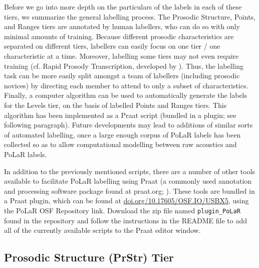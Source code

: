 \documentclass[11pt, twoside]{memoir}
\begin{document}
Before we go into more depth on the particulars of the labels in each of these tiers, we summarize the general labelling process. The Prosodic Structure, Points, and Ranges tiers are annotated by human labellers, who can do so with only minimal amounts of training. Because different prosodic characteristics are separated on different tiers, labellers can easily focus on one tier / one characteristic at a time. Moreover, labelling some tiers may not even require training (cf. Rapid Prosody Transcription, developed by \citealt{cole-14}). Thus, the labelling task can be more easily split amongst a team of labellers (including prosodic novices) by directing each member to attend to only a subset of characteristics. Finally, a computer algorithm can be used to automatically generate the labels for the Levels tier, on the basis of labelled Points and Ranges tiers. This algorithm has been implemented as a Praat script (bundled in a plugin; see following paragraph). Future developments may lead to additions of similar sorts of automated labelling, once a large enough corpus of PoLaR labels has been collected so as to allow computational modelling between raw acoustics and PoLaR labels.

In addition to the previously mentioned scripts, there are a number of other tools available to facilitate PoLaR labelling using Praat (a commonly used annotation and processing software package found at praat.org; \citealt{praat}). These tools are bundled in a Praat plugin, which can be found at \href{https://doi.org/10.17605/OSF.IO/USBX5}{\uline{doi.org/10.17605/OSF.IO/USBX5}}, using the PoLaR OSF Repository link. Download the zip file named \texttt{plugin\_PoLaR} found in the repository and follow the instructions in the README file to add all of the currently available scripts to the Praat editor window.

\subsection{Prosodic Structure (PrStr) Tier}\label{sec:prosodic-structure-prstr}
\end{document}
